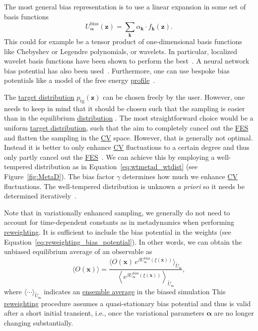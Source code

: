 \documentclass[9pt,review]{livecoms}
\newcommand{\vx}{\mathbf{x}}
\newcommand{\vz}{\mathbf{z}}
\begin{document}
The most general bias representation is to use a linear expansion in some set of basis functions
\begin{equation}
U_{\boldsymbol{\alpha}}^{\mathrm{bias}}(\vz) = \sum_{\mathbf{k}} \alpha_{\mathbf{k}} \cdot f_{\mathbf{k}}(\vz).
\end{equation}
This could for example be a tensor product of one-dimensional basis functions like Chebyshev or Legendre polynomials, or wavelets. In particular, localized wavelet basis functions have been shown to perform the best~\cite{ValssonPampel_Wavelets_2022}. A neural network bias potential has also been used~\cite{Bonati2019_NN-VES}. Furthermore, one can use bespoke bias potentials like a model of the free energy \hyperlink{ref:FES} {profile}~\cite{McCarty2016_JCTC,Piaggi2016_Faraday}.

The \hyperlink{ref:targetdist}{target distribution} $p_{\mathrm{tg}}(\vz)$ can be chosen freely by the user. However, one needs to keep in mind that it should be chosen such that the sampling is easier than in the equilibrium \hyperlink{ref:Distribution} {distribution} . The most straightforward choice would be a uniform \hyperlink{ref:targetdist}{target distribution}, such that the aim to completely cancel out the \hyperlink{ref:FES} {FES} and flatten the sampling in the \hyperlink{ref:CV} {CV} space. However, that is generally not optimal. Instead it is better to only enhance \hyperlink{ref:CV} {CV} fluctuations to a certain degree and thus only partly cancel out the \hyperlink{ref:FES} {FES}~\cite{Valsson-JCTC-2015}. We can achieve this by employing a well-tempered distribution as in Equation~\ref{eq:wtmetad_wtdist} (see Figure~\ref{fig:MetaD}). The bias factor $\gamma$ determines how much we enhance \hyperlink{ref:CV} {CV} fluctuations. The well-tempered distribution is unknown \textit{a priori} so it needs be determined iteratively~\cite{Valsson-JCTC-2015}.

Note that in variationally enhanced sampling, we generally do not need to account for time-dependent constants as in metadynamics when performing \hyperlink{ref:Reweighting} {reweighting}. It is sufficient to include the bias potential in the weights (see Equation~\ref{eq:reweighting_bias_potential}). In other words, we can obtain the unbiased equilibrium average of an observable as
\begin{equation}
\label{ves_reweighting}
\langle O(\vx) \rangle = \frac{\langle O(\vx)
\,
e^{
\beta
U_{\boldsymbol{\alpha}}^{\mathrm{bias}}(\xi(\vx))
}\rangle_{\tilde U_{\boldsymbol{\alpha}}}}
{\left\langle
e^{\beta
U_{\boldsymbol{\alpha}}^{\mathrm{bias}}(\xi(\vx))
} \right\rangle_{\tilde U_{\boldsymbol{\alpha}}}},
\end{equation}
where $\langle \cdots \rangle_{\tilde U_{\boldsymbol{\alpha}}}$ indicates an \hyperlink{ref:ensemble_average} {ensemble average} in the biased simulation  This \hyperlink{ref:Reweighting} {reweighting} procedure assumes a quasi-stationary bias potential and thus is valid after a short initial transient, i.e., once the variational parameters $\boldsymbol{\alpha}$ are no longer changing substantially.
\end{document}
